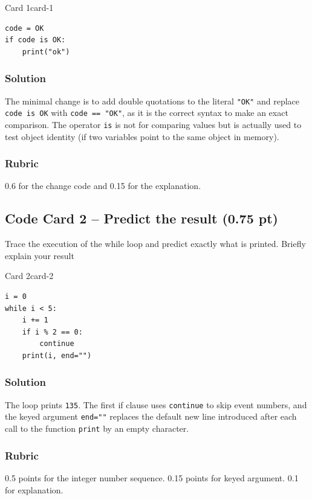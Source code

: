 \documentclass[10pt]{article}
\begin{document}
\begin{card}{ Card 1}{card-1}
\begin{verbatim}
code = OK
if code is OK:
    print("ok")
\end{verbatim}
\end{card}

\subsubsection*{Solution}
The minimal change is to add double quotations to the literal \verb|"OK"| and replace \verb|code is OK| with \verb|code == "OK"|,  as it is the correct syntax to make an exact comparison. The operator \verb|is| is not for comparing values but is actually used to test object identity (if two variables point to the same object in memory). 

\subsubsection*{Rubric}
0.6 for the change code and 0.15 for the explanation. 

\subsection*{Code Card 2 -- Predict the result (0.75 pt)}
 Trace the execution of the while loop and predict exactly what is printed. Briefly explain your result

\begin{card}{ Card 2}{card-2}
\begin{verbatim}
i = 0
while i < 5:
    i += 1
    if i % 2 == 0:
        continue
    print(i, end="")
\end{verbatim}
\end{card}

\subsubsection*{Solution} 
The loop prints \verb|135|. The first if clause uses \verb|continue| to skip event numbers, and the keyed argument \verb|end=""| replaces the default new line introduced after each call to the function \verb|print| by an empty character. 

\subsubsection*{Rubric}
0.5 points for the integer number sequence. 0.15 points for keyed argument. 0.1 for explanation.
\end{document}
